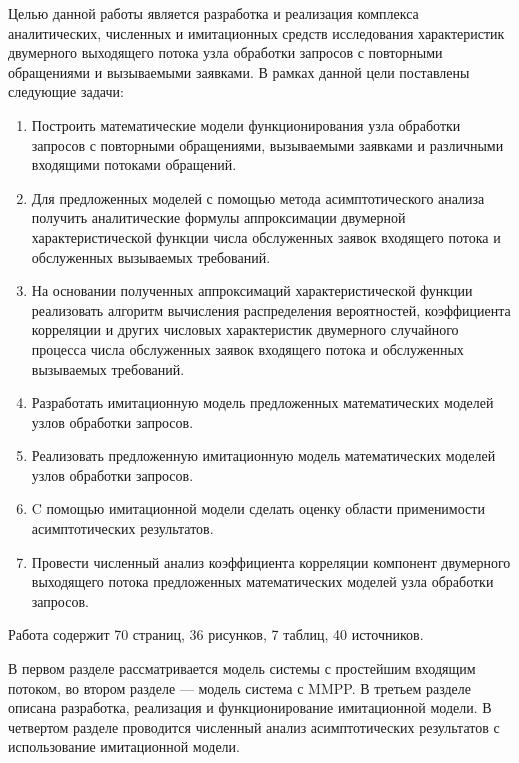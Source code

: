 Целью данной работы является разработка и реализация  комплекса аналитических, численных и имитационных средств исследования характеристик двумерного выходящего потока узла обработки запросов с повторными обращениями и вызываемыми заявками. В рамках данной цели поставлены следующие задачи:
\begin{enumerate}
	\item Построить математические модели функционирования узла обработки запросов с повторными обращениями, вызываемыми заявками и различными входящими потоками обращений.
	\item Для предложенных моделей с помощью метода асимптотического анализа получить аналитические формулы аппроксимации двумерной характеристической функции числа обслуженных заявок входящего потока и обслуженных вызываемых требований. 
	\item На основании полученных аппроксимаций характеристической функции реализовать алгоритм вычисления распределения вероятностей, коэффициента корреляции и других числовых характеристик двумерного случайного процесса числа обслуженных заявок входящего потока и обслуженных вызываемых требований.
	\item Разработать имитационную модель предложенных математических моделей узлов обработки запросов.
	\item Реализовать предложенную имитационную модель математических моделей узлов обработки запросов.
	\item C помощью имитационной модели сделать оценку области применимости асимптотических результатов.
	\item Провести численный анализ коэффициента корреляции компонент двумерного выходящего потока предложенных математических моделей узла обработки запросов.
\end{enumerate}

Работа содержит 70 страниц, 36 рисунков, 7 таблиц, 40 источников.

В первом разделе рассматривается модель системы с простейшим входящим потоком, во втором разделе --- модель система с MMPP. В третьем разделе описана разработка, реализация и функционирование имитационной модели. В четвертом разделе проводится численный анализ асимптотических результатов с использование имитационной модели.

 \clearpage